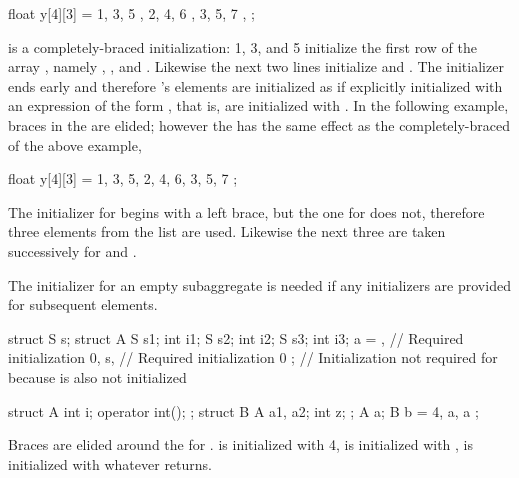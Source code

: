 \pnum
\begin{example}
\begin{codeblock}
float y[4][3] = {
  { 1, 3, 5 },
  { 2, 4, 6 },
  { 3, 5, 7 },
};
\end{codeblock}
is a completely-braced initialization:
1, 3, and 5 initialize the first row of the array
,
namely
,
,
and
.
Likewise the next two lines initialize
and
.
The initializer ends early and therefore
's
elements are initialized as if explicitly initialized with an
expression of the form
,
that is, are initialized with
.
In the following example, braces in the
are elided;
however the
has the same effect as the completely-braced
of the above example,
\begin{codeblock}
float y[4][3] = {
  1, 3, 5, 2, 4, 6, 3, 5, 7
};
\end{codeblock}

The initializer for
begins with a left brace, but the one for
does not,
therefore three elements from the list are used.
Likewise the next three are taken successively for
and
.
\end{example}

\pnum
\begin{note}
The initializer for an empty subaggregate is needed
if any initializers are provided for subsequent elements.
\begin{example}
\begin{codeblock}
struct S { } s;
struct A {
  S s1;
  int i1;
  S s2;
  int i2;
  S s3;
  int i3;
} a = {
  { },              // Required initialization
  0,
  s,                // Required initialization
  0
};                  // Initialization not required for  because  is also not initialized
\end{codeblock}
\end{example}
\end{note}

\pnum
\begin{example}
\begin{codeblock}
struct A {
  int i;
  operator int();
};
struct B {
  A a1, a2;
  int z;
};
A a;
B b = { 4, a, a };
\end{codeblock}
Braces are elided around the
for
.
is initialized with 4,
is initialized with
,
is initialized with whatever
returns.
\end{example}

